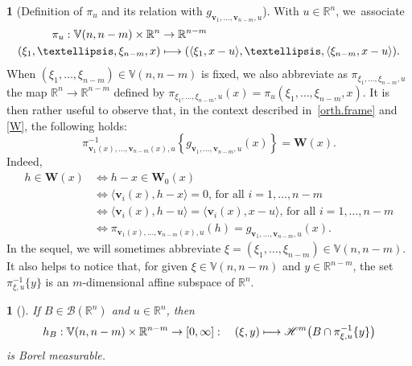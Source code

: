 \documentclass[11pt]{article}
\newcounter{cdrthm}[section]
\theoremstyle{definition}
\theoremstyle{jepanonymous}
\newtheorem{jepempty}[cdrthm]{}
\newenvironment{enonce}[2][remark]{\begin{jepempty}[#2]}{\end{jepempty}}
\theoremstyle{plain}
\newcommand\mto{\mathchoice{\longmapsto}{\mapsto}{\mapsto}{\mapsto}}
\newenvironment{Empty}[2][\null]{%
\begin{enonce}[remark]{#1}#2}
{\end{enonce}}
\newcommand{\R}{\mathbb{R}}
\newcommand{\Rn}{\R^n}
\newcommand{\calB}{\mathscr{B}}
\newcommand{\calH}{\mathscr{H}}
\newcommand{\bW}{{\boldsymbol{W}}}
\newcommand{\bv}{{\boldsymbol{v}}}
\newcommand{\bV}{\mathbb{V}}
\let\la\langle
\let\ra\rangle
\begin{document}
\begin{Empty}[Definition of $\pi_u$ and its relation with $g_{\bv_1,\ldots,\bv_{n-m},u}$]
\label{pi.u}
With $u \in \Rn$, we~asso\-ciate
\begin{align*}
\pi_u: \bV(n,n-m) \times \Rn &\to \R^{n-m}\\
(\xi_1,\ldots,\xi_{n-m},x) &\mto(\la \xi_1,x-u\ra, \ldots, \la \xi_{n-m},x-u\ra).
\end{align*}
When $(\xi_1,\ldots,\xi_{n-m}) \in \bV(n,n-m)$ is fixed, we also abbreviate as $\pi_{\xi_1,\ldots,\xi_{n-m},u}$ the map $\Rn \to \R^{n-m}$ defined by $\pi_{\xi_1,\ldots,\xi_{n-m},u}(x) = \pi_u(\xi_1,\ldots,\xi_{n-m},x)$.
It is then rather useful to observe that, in the context described in~\ref{orth.frame} and \ref{W}, the following holds:
\begin{equation}
\label{eq.4}
\pi_{\bv_1(x),\ldots,\bv_{n-m}(x),u}^{-1}\left\{ g_{\bv_1,\ldots,\bv_{n-m},u}(x) \right\} = \bW(x).
\end{equation}
Indeed,
\begin{equation*}
\begin{split}
h \in \bW(x) & \iff h-x \in \bW_0(x) \\
& \iff \la \bv_i(x), h-x \ra = 0 \text{, for all } i=1,\ldots,n-m \\
& \iff \la \bv_i(x), h-u \ra = \la \bv_i(x), x-u \ra \text{, for all } i=1,\ldots,n-m \\
& \iff \pi_{\bv_1(x),\ldots,\bv_{n-m}(x),u}(h) = g_{\bv_1,\ldots,\bv_{n-m},u}(x).
\end{split}
\end{equation*}
In the sequel, we will sometimes abbreviate $\xi = (\xi_1,\ldots,\xi_{n-m}) \in \bV(n,n-m)$.
It also helps to notice that, for given $\xi \in \bV(n,n-m)$ and $y \in \R^{n-m}$, the set $\pi_{\xi,u}^{-1}\{y\}$ is an $m$-dimensional affine subspace of $\Rn$.
\end{Empty}

\begin{Empty}[]
\label{measurability}
{\it
If $B \in \calB(\Rn)$ and $u \in \Rn$, then
\begin{equation*}
h_{B}: \bV(n,n-m) \times \R^{n-m} \to [0,\infty]:\quad (\xi,y) \mto \calH^m\bigl(B \cap \pi_{\xi,u}^{-1}\{y\} \bigr)
\end{equation*}
is Borel measurable.
}
\end{Empty}
\end{document}
